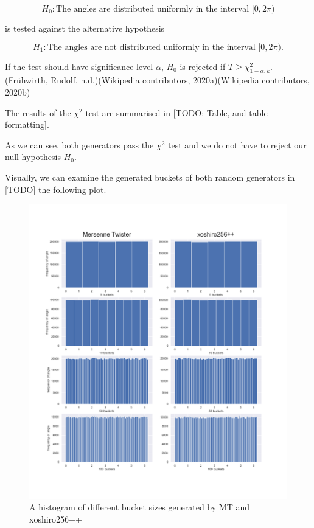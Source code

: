 \documentclass[
]{article}
\begin{document}
\[
H_0: \textrm{The angles are distributed uniformly in the interval } [0, 2 \pi)
\]

is tested against the alternative hypothesis

\[
H_1: \textrm{The angles are not distributed uniformly in the interval } [0, 2 \pi) \textrm{.}
\]

If the test should have significance level \(\alpha\), \(H_0\) is
rejected if \(T \ge \chi^2_{1-\alpha, k}\).(Frühwirth, Rudolf,
n.d.)(Wikipedia contributors, 2020a)(Wikipedia contributors, 2020b)

The results of the \(\chi^2\) test are summarised in {[}TODO: Table, and
table formatting{]}.

As we can see, both generators pass the \(\chi^2\) test and we do not
have to reject our null hypothesis \(H_0\).

Visually, we can examine the generated buckets of both random generators
in {[}TODO{]} the following plot.

\begin{figure}
\centering
\includegraphics{Assets/angle_buckets.png}
\caption{A histogram of different bucket sizes generated by MT and
xoshiro256++}
\end{figure}
\end{document}
